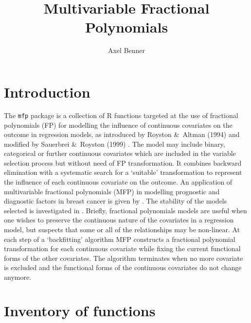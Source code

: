 \documentclass[11pt]{article}
\begin{document}
\title{Multivariable Fractional Polynomials}
\author{Axel Benner}




\maketitle
\tableofcontents
\section{Introduction}
The \texttt{mfp} package is a collection of R \cite{R04} functions targeted at the use of fractional polynomials (FP) for modelling the influence of continuous covariates on the outcome in regression models, as introduced by Royston \&\ Altman (1994) \cite{FP94} and 
modified by Sauerbrei \&\ Royston (1999) \cite{SauRoy99}. 
The model may include binary, categorical or further continuous covariates which are included in the variable selection process but without need of FP transformation.
It combines backward elimination with a systematic search for a `suitable' transformation 
to represent the influence of each continuous covariate on the outcome. 
An application of multivariable fractional polynomials (MFP) in modelling prognostic and 
diagnostic factors in breast cancer is given by \cite{SauRoy99}.
The stability of the models selected is investigated in \cite{RoySau03}.
Briefly, fractional polynomials models are useful when one wishes to preserve the continuous 
nature of the covariates in a regression model, but suspects that some or all of the 
relationships may be non-linear. 
At each step of a `backfitting' algorithm MFP constructs a fractional polynomial transformation
for each continuous covariate while fixing the current functional forms of the other covariates. 
The algorithm terminates when no more covariate is excluded and the functional forms of the continuous covariates do not change anymore.

\section{Inventory of functions}
\end{document}
